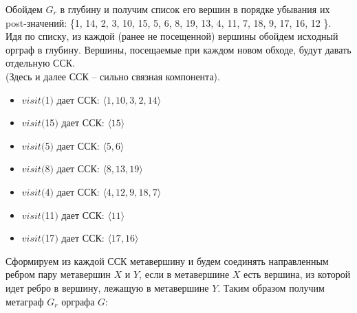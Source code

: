 \documentclass{article}
\begin{document}
\begin{adjustbox}{max size={1.4\textwidth}{0,7\textheight}, center}
\end{adjustbox}
 \vspace{4mm} 

 Обойдем $G_r$ в глубину и получим список его вершин в порядке убывания их post-значений: \{1, 14, 2, 3, 10, 15, 5, 6, 8, 19, 13, 4, 11, 7, 18, 9, 17, 16, 12 \}.\\Идя по списку, из каждой (ранее не посещенной) вершины обойдем $исходный$ орграф в глубину.
Вершины, посещаемые при каждом новом обходе, будут давать отдельную ССК.
\\(Здесь и далее ССК – сильно связная компонента).\\
\begin{itemize}
\item $visit($1$)$ дает ССК: $\langle 1, 10, 3, 2, 14 \rangle$\item $visit($15$)$ дает ССК: $\langle 15 \rangle$\item $visit($5$)$ дает ССК: $\langle 5, 6 \rangle$\item $visit($8$)$ дает ССК: $\langle 8, 13, 19 \rangle$\item $visit($4$)$ дает ССК: $\langle 4, 12, 9, 18, 7 \rangle$\item $visit($11$)$ дает ССК: $\langle 11 \rangle$\item $visit($17$)$ дает ССК: $\langle 17, 16 \rangle$
\end{itemize}

Сформируем из каждой ССК метавершину и будем соединять направленным ребром пару метавершин $X$ и $Y$,
если в метавершине $X$ есть вершина, из которой идет ребро в вершину, лежащую в метавершине $Y$.
Таким образом получим метаграф $G_r$ орграфа $G$:\\\\
\end{document}
